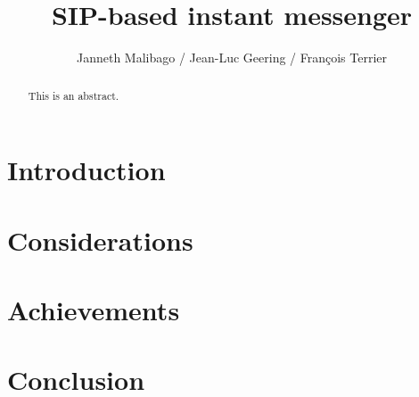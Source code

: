 \documentclass[a4paper,10pt]{scrartcl}
\title{SIP-based instant messenger}
\author{Janneth Malibago / Jean-Luc Geering / Fran\c{c}ois Terrier}
\begin{document}
\maketitle

\begin{abstract}
	This is an abstract.
\end{abstract}

\section{Introduction}


\section{Considerations}


\section{Achievements}


\section{Conclusion}
\end{document}
